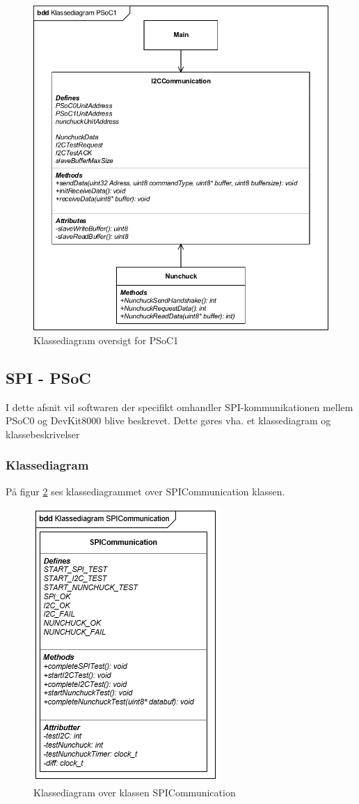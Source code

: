 \begin{figure}[H]
	\centering
	\includegraphics[width=.7\textwidth]{DesignOgImplementering/images/PSoC1KlassediagramOversigt}
	\caption{Klassediagram oversigt for PSoC1}
	\label{figure:klassediagramPSoC1}
\end{figure}

\subsection{SPI - PSoC}
I dette afsnit vil softwaren der specifikt omhandler SPI-kommunikationen mellem PSoC0 og DevKit8000 blive beskrevet. Dette gøres vha. et klassediagram og klassebeskrivelser

\subsubsection{Klassediagram}
På figur \ref{figure:KlassediagramSPICommunication} ses klassediagrammet over SPICommunication klassen.

\begin{figure}[H]
	\centering
	\includegraphics[]{DesignOgImplementering/images/SPICommunication}
	\caption{Klassediagram over klassen SPICommunication}
	\label{figure:KlassediagramSPICommunication}
\end{figure}
